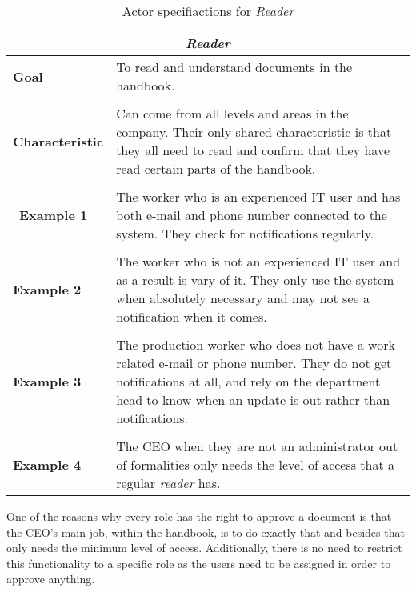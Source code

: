 \begin{table}[H]
	\begin{tabular}{l p{11.3cm}}
		\hline
		\multicolumn{2}{c}{\textbf{\textit{Reader}}}\\
		\hline
		
		\textbf{Goal} & To read and understand documents in the handbook. \\
		&  \\
		
		\textbf{Characteristic} & Can come from all levels and areas in the company.
		Their only shared characteristic is that they all need to read and confirm that they have read certain parts of the handbook.\\
		&  \\
		\
		\textbf{Example 1}
		& The worker who is an experienced IT user and has both e-mail and phone number connected to the system.
		They check for notifications regularly.\\
		&  \\
		
		\textbf{Example 2}
		& The worker who is not an experienced IT user and as a result is vary of it. 
		They only use the system when absolutely necessary and may not see a notification when it comes.\\
		
		&  \\
		\textbf{Example 3}
		& The production worker who does not have a work related e-mail or phone number. 
		They do not get notifications at all, and rely on the department head to know when an update is out rather than notifications.\\
		&  \\
		
		\textbf{Example 4}
		& The CEO when they are not an administrator out of formalities only needs the level of access that a regular \textit{reader} has.\\		
		
		\hline
	\end{tabular}
	\caption{Actor specifiactions for \textit{Reader}}\label{tab:Actor-reader}
\end{table}

One of the reasons why every role has the right to approve a document is that the CEO's main job, within the handbook, is to do exactly that and besides that only needs the minimum level of access.
Additionally, there is no need to restrict this functionality to a specific role as the users need to be assigned in order to approve anything.
